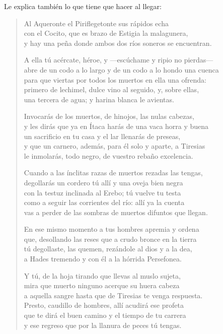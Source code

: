 Le explica también lo que tiene que hacer al llegar:

\begin{verse}
Al Aqueronte el Piriflegetonte sus rápidos echa\\
con el Cocito, que es brazo de Estigia la malagunera,\\
y hay una peña donde ambos dos ríos soneros se encuentran.

A ella tú acércate, héroe, y ---escúchame y ripio no pierdas---\\
abre de un codo a lo largo y de un codo a lo hondo una cuenca\\
para que viertas por todos los muertos en ella una ofrenda:\\
primero de lechimel, dulce vino al seguido, y, sobre ellas,\\
una tercera de agua; y harina blanca le avientas.

Invocarás de los muertos, de hinojos, las nulas cabezas,\\
y les dirás que ya en Ítaca harás de una vaca horra y buena\\
un sacrificio en tu casa y el lar llenarás de preseas,\\
y que un carnero, además, para él solo y aparte, a Tiresias\\
le inmolarás, todo negro, de vuestro rebaño excelencia.

Cuando a las ínclitas razas de muertos rezadas las tengas,\\
degollarás un cordero tú allí y una oveja bien negra\\
con la testuz inclinada al Erebo; tú vuelve tu testa\\
como a seguir las corrientes del río: allí ya la cuenta\\
vas a perder de las sombras de muertos difuntos que llegan.

En ese mismo momento a tus hombres apremia y ordena\\
que, desollando las reses que a crudo bronce en la tierra\\
tú degollaste, las quemen, rezándole al dios y a la dea,\\
a Hades tremendo y con él a la hórrida Persefonea.

Y tú, de la hoja tirando que llevas al muslo sujeta,\\
mira que muerto ninguno acerque su huera cabeza\\
a aquella sangre hasta que de Tiresias te venga respuesta.\\
Presto, caudillo de hombres, allí acudirá ese profeta\\
que te dirá el buen camino y el tiempo de tu carrera\\
y ese regreso que por la llanura de peces tú tengas.
\end{verse}

